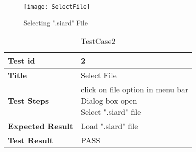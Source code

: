 \begin{enumerate}
\begin{figure}[ht]
\centering
\texttt{[image: SelectFile]}
\caption{Selecting ".siard" File}
\label{fig:Selecting .siard File}
\end{figure} 

\begin{table}[]
\centering
\begin{tabular}{|l|l|}
\hline
\bfseries Test id          & 2                 \\
\hline
\bfseries Title        & Select File \\
\hline
\bfseries  Test Steps        & \makecell{click on file option in menu bar \\ Dialog box open \\Select ".siard" file}          \\
\hline
\bfseries Expected Result & Load ".siard" file         \\
\hline
\bfseries Test Result & PASS \\
\hline                   
\end{tabular}
\caption{TestCase2}
\label{TestCase2}
\end{table}


\end{enumerate}
